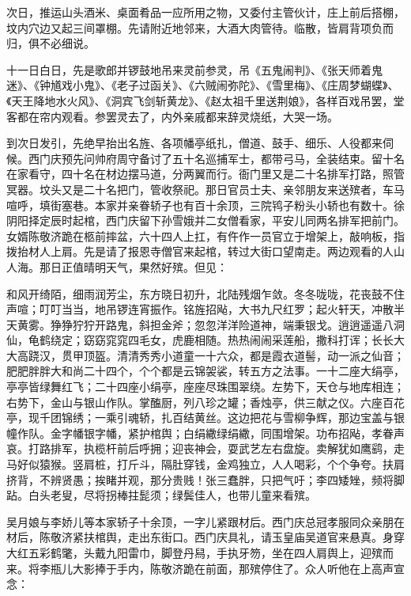 次日，推运山头酒米、桌面肴品一应所用之物，又委付主管伙计，庄上前后搭棚，坟内穴边又起三间罩棚。先请附近地邻来，大酒大肉管待。临散，皆肩背项负而归，俱不必细说。

十一日白日，先是歌郎并锣鼓地吊来灵前参灵，吊《五鬼闹判》、《张天师着鬼迷》、《钟馗戏小鬼》、《老子过函关》、《六贼闹弥陀》、《雪里梅》、《庄周梦蝴蝶》、《天王降地水火风》、《洞宾飞剑斩黄龙》、《赵太祖千里送荆娘》，各样百戏吊罢，堂客都在帘内观看。参罢灵去了，内外亲戚都来辞灵烧纸，大哭一场。

到次日发引，先绝早抬出名旌、各项幡亭纸扎，僧道、鼓手、细乐、人役都来伺候。西门庆预先问帅府周守备讨了五十名巡捕军士，都带弓马，全装结束。留十名在家看守，四十名在材边摆马道，分两翼而行。衙门里又是二十名排军打路，照管冥器。坟头又是二十名把门，管收祭祀。那日官员士夫、亲邻朋友来送殡者，车马喧呼，填街塞巷。本家并亲眷轿子也有百十余顶，三院鸨子粉头小轿也有数十。徐阴阳择定辰时起棺，西门庆留下孙雪娥并二女僧看家，平安儿同两名排军把前门。女婿陈敬济跪在柩前摔盆，六十四人上扛，有仵作一员官立于增架上，敲响板，指拨抬材人上肩。先是请了报恩寺僧官来起棺，转过大街口望南走。两边观看的人山人海。那日正值晴明天气，果然好殡。但见：

和风开绮陌，细雨润芳尘，东方晓日初升，北陆残烟乍敛。冬冬咙咙，花丧鼓不住声喧；叮叮当当，地吊锣连宵振作。铭旌招飐，大书九尺红罗；起火轩天，冲散半天黄雾。狰狰狞狞开路鬼，斜担金斧；忽忽洋洋险道神，端秉银戈。逍逍遥遥八洞仙，龟鹤绕定；窈窈窕窕四毛女，虎鹿相随。热热闹闹采莲船，撒科打诨；长长大大高跷汉，贯甲顶盔。清清秀秀小道童一十六众，都是霞衣道髻，动一派之仙音；肥肥胖胖大和尚二十四个，个个都是云锦袈裟，转五方之法事。一十二座大绢亭，亭亭皆绿舞红飞；二十四座小绢亭，座座尽珠围翠绕。左势下，天仓与地库相连；右势下，金山与银山作队。掌醢厨，列八珍之罐；香烛亭，供三献之仪。六座百花亭，现千团锦绣；一乘引魂轿，扎百结黄丝。这边把花与雪柳争辉，那边宝盖与银幢作队。金字幡银字幡，紧护棺舆；白绢繖绿绢繖，同围增架。功布招飐，孝眷声哀。打路排军，执榄杆前后呼拥；迎丧神会，耍武艺左右盘旋。卖解犹如鹰鹞，走马好似猿猴。竖肩桩，打斤斗，隔肚穿钱，金鸡独立，人人喝彩，个个争夸。扶肩挤背，不辨贤愚；挨睹并观，那分贵贱！张三蠢胖，只把气吁；李四矮矬，频将脚跕。白头老叟，尽将拐棒拄髭须；绿鬓佳人，也带儿童来看殡。

吴月娘与李娇儿等本家轿子十余顶，一字儿紧跟材后。西门庆总冠孝服同众亲朋在材后，陈敬济紧扶棺舆，走出东街口。西门庆具礼，请玉皇庙吴道官来悬真。身穿大红五彩鹤氅，头戴九阳雷巾，脚登丹舄，手执牙笏，坐在四人肩舆上，迎殡而来。将李瓶儿大影捧于手内，陈敬济跪在前面，那殡停住了。众人听他在上高声宣念：


